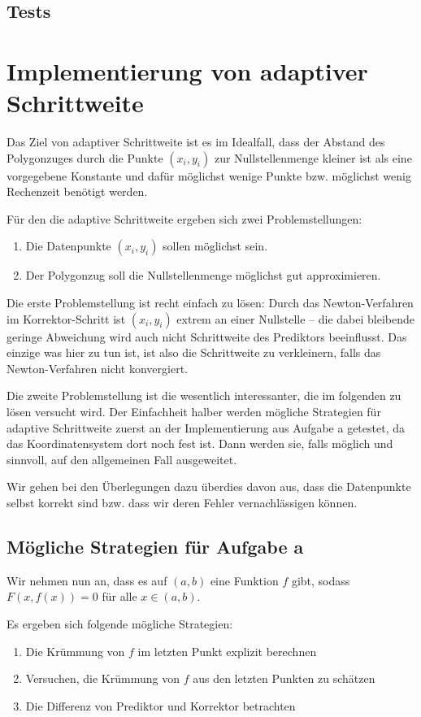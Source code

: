 \documentclass[a4paper,11pt,bibliography=totoc,listof=totoc,headinclude=true,cleardoublepage=empty,oneside]{scrartcl}
\begin{document}
\subsection{Tests}


\section{Implementierung von adaptiver Schrittweite}
Das Ziel von adaptiver Schrittweite ist es im Idealfall, dass der Abstand des Polygonzuges durch die Punkte $(x_i,y_i)$ zur Nullstellenmenge kleiner ist als eine vorgegebene Konstante und dafür möglichst wenige Punkte bzw. möglichst wenig Rechenzeit benötigt werden.

Für den die adaptive Schrittweite ergeben sich zwei Problemstellungen:
\begin{enumerate}
	\item Die Datenpunkte $(x_i,y_i)$ sollen möglichst sein.
	\item Der Polygonzug soll die Nullstellenmenge möglichst gut approximieren.
\end{enumerate}

Die erste Problemstellung ist recht einfach zu lösen: Durch das Newton-Verfahren im Korrektor-Schritt ist $(x_i,y_i)$ extrem an einer Nullstelle -- die dabei bleibende geringe Abweichung wird auch nicht Schrittweite des Prediktors beeinflusst. Das einzige was hier zu tun ist, ist also die Schrittweite zu verkleinern, falls das Newton-Verfahren nicht konvergiert. 

Die zweite Problemstellung ist die wesentlich interessanter, die im folgenden zu lösen versucht wird. Der Einfachheit halber werden mögliche Strategien für adaptive Schrittweite zuerst an der Implementierung aus Aufgabe a getestet, da das Koordinatensystem dort noch fest ist. Dann werden sie, falls möglich und sinnvoll, auf den allgemeinen Fall ausgeweitet.

Wir gehen bei den Überlegungen dazu überdies davon aus, dass die Datenpunkte selbst korrekt sind bzw. dass wir deren Fehler vernachlässigen können.
\subsection{Mögliche Strategien für Aufgabe a}\label{chap:5.1}
Wir nehmen nun an, dass es auf $(a,b)$ eine Funktion $f$ gibt, sodass $F(x,f(x))=0$ für alle $x \in (a,b)$. 

Es ergeben sich folgende mögliche Strategien:
\begin{enumerate}
	\item Die Krümmung von $f$  im letzten Punkt explizit berechnen
	\item Versuchen, die Krümmung von $f$ aus den letzten Punkten zu schätzen 
	\item Die Differenz von Prediktor und Korrektor betrachten
\end{enumerate}
\end{document}
